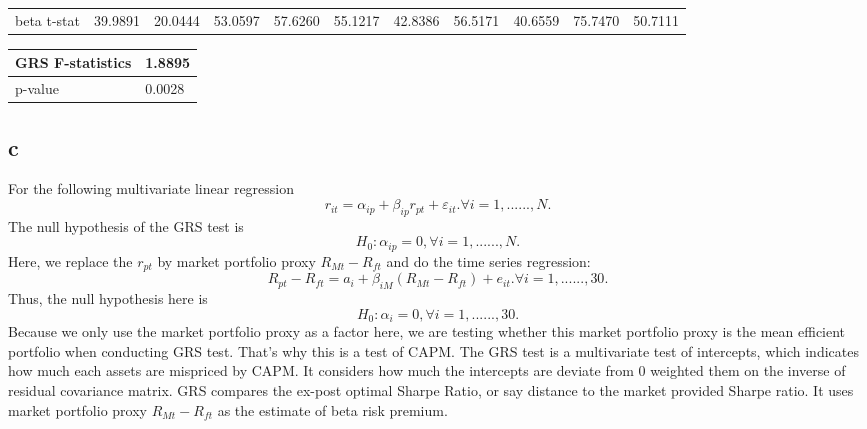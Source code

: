 \documentclass{report}
\begin{document}
\begin{table}[H]
\begin{tabular}{@{}|l|llllllllll@{}}
beta t-stat  & 39.9891                    & 20.0444                    & 53.0597                    & 57.6260                    & 55.1217                    & 42.8386                    & 56.5171                    & 40.6559                    & 75.7470                    & 50.7111                    \\ \cmidrule(r){1-1}
\end{tabular}
\end{table}
\begin{table}[H]
\centering
\begin{tabular}{|l|l|}
\hline
GRS F-statistics & 1.8895 \\ \hline
p-value          & 0.0028 \\ \hline
\end{tabular}
\end{table}

\subsection{c}
For the following multivariate linear regression
\[ r_{it} = \alpha_{ip}+\beta_{ip}r_{pt}+\varepsilon_{it}. \forall i = 1,......,N. \]
The null hypothesis of the GRS test is 
\[ H_{0}: \alpha_{ip} = 0, \forall i = 1,......,N. \]
Here, we replace the $r_{pt}$ by market portfolio proxy $R_{Mt}-R_{ft}$ and do the time series regression:
\[ R_{pt}-R_{ft} = a_{i}+\beta_{iM}(R_{Mt}-R_{ft})+e_{it}. \forall i =1,......,30. \]
Thus, the null hypothesis here is
\[ H_{0}: \alpha_{i} = 0, \forall i = 1,......,30. \]
Because we only use the market portfolio proxy as a factor here, we are testing whether this market portfolio proxy is the mean efficient portfolio when conducting GRS test. That's why this is a test of CAPM. The GRS test is a multivariate test of intercepts, which indicates how much each assets are mispriced by CAPM. It considers how much the intercepts are deviate from 0 weighted them on the inverse of residual covariance matrix. GRS compares the ex-post optimal Sharpe Ratio, or say distance to the market provided Sharpe ratio. It uses market portfolio proxy $R_{Mt}-R_{ft}$ as the estimate of beta risk premium.
\end{document}
